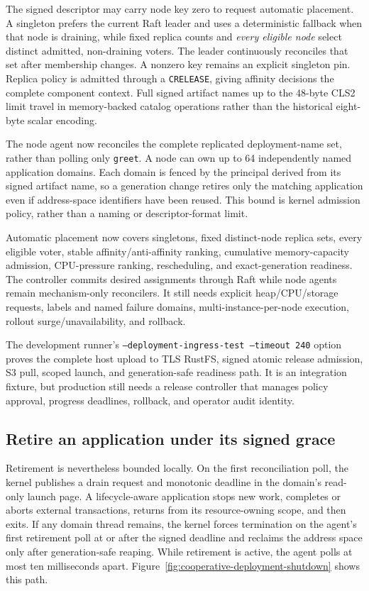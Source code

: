The signed descriptor may carry node key zero to request automatic placement.
A singleton prefers the current Raft leader and uses a deterministic fallback
when that node is draining, while fixed replica counts and
\emph{every eligible node} select distinct admitted, non-draining voters. The
leader continuously reconciles that set after membership changes. A nonzero
key remains an explicit singleton pin. Replica policy is admitted through a
\texttt{CRELEASE}, giving affinity decisions the complete component context.
Full signed artifact names
up to the 48-byte CLS2 limit travel in memory-backed catalog operations rather
than the historical eight-byte scalar encoding.

The node agent now reconciles the complete replicated deployment-name set,
rather than polling only \texttt{greet}. A node can own up to 64 independently
named application domains. Each domain is fenced by the principal derived from
its signed artifact name, so a generation change retires only the matching
application even if address-space identifiers have been reused. This bound is
kernel admission policy, rather than a naming or descriptor-format limit.

Automatic placement now covers singletons, fixed distinct-node replica sets,
every eligible voter, stable affinity/anti-affinity ranking, cumulative
memory-capacity admission, CPU-pressure ranking, rescheduling, and
exact-generation readiness. The controller commits desired assignments
through Raft while node agents remain mechanism-only reconcilers. It still
needs explicit heap/CPU/storage requests, labels and named failure domains,
multi-instance-per-node execution, rollout surge/unavailability, and rollback.

The development runner's
\texttt{--deployment-ingress-test --timeout 240} option proves the complete
host upload to TLS RustFS, signed atomic release admission, S3 pull, scoped
launch, and generation-safe readiness path. It is an integration fixture, but
production still needs a release controller that manages policy approval,
progress deadlines, rollback, and operator audit identity.

\subsection{Retire an application under its signed grace}

Retirement is nevertheless bounded locally. On the first reconciliation poll,
the kernel publishes a drain request and monotonic deadline in the domain's
read-only launch page. A lifecycle-aware application stops new work, completes
or aborts external transactions, returns from its resource-owning scope, and
then exits. If any domain thread remains, the kernel forces termination on the
agent's first retirement poll at or after the signed deadline and reclaims the
address space only after generation-safe reaping. While retirement is active,
the agent polls at most ten milliseconds apart.
Figure~\ref{fig:cooperative-deployment-shutdown} shows this path.

